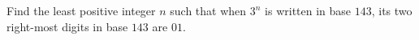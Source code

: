 Find the least positive integer $n$ such that when $3^n$ is written in base $143$, its two right-most digits in base $143$ are $01$.